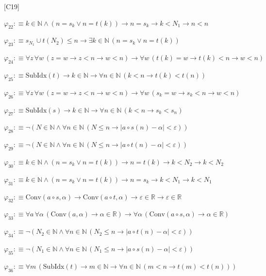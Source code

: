 \begin{fullproof}{[C19]}
\begin{abbrevlist}
\item $\varphi_{22} :\equiv k \in \mathbb{N} \land (n = s_{k} \lor n = t(k)) \to n = s_{k} \to k < N_{1} \to n < n$
\item $\varphi_{23} :\equiv s_{N_{1}} \cup t(N_{2}) \leq n \to \exists k \in \mathbb{N}\,(n = s_{k} \lor n = t(k))$
\item $\varphi_{24} :\equiv \forall z\,\forall w\,(z = w \to z < n \to w < n) \to \forall w\,(t(k) = w \to t(k) < n \to w < n)$
\item $\varphi_{25} :\equiv \mathrm{SubIdx}(t) \to k \in \mathbb{N} \to \forall n \in \mathbb{N}\,(k < n \to t(k) < t(n))$
\item $\varphi_{26} :\equiv \forall z\,\forall w\,(z = w \to z < n \to w < n) \to \forall w\,(s_{k} = w \to s_{k} < n \to w < n)$
\item $\varphi_{27} :\equiv \mathrm{SubIdx}(s) \to k \in \mathbb{N} \to \forall n \in \mathbb{N}\,(k < n \to s_{k} < s_{n})$
\item $\varphi_{28} :\equiv \neg (N \in \mathbb{N} \land \forall n \in \mathbb{N}\,(N \leq n \to \lvert a \circ s(n) - \alpha \rvert < \varepsilon))$
\item $\varphi_{29} :\equiv \neg (N \in \mathbb{N} \land \forall n \in \mathbb{N}\,(N \leq n \to \lvert a \circ t(n) - \alpha \rvert < \varepsilon))$
\item $\varphi_{30} :\equiv k \in \mathbb{N} \land (n = s_{k} \lor n = t(k)) \to n = t(k) \to k < N_{2} \to k < N_{2}$
\item $\varphi_{31} :\equiv k \in \mathbb{N} \land (n = s_{k} \lor n = t(k)) \to n = s_{k} \to k < N_{1} \to k < N_{1}$
\item $\varphi_{32} :\equiv \mathrm{Conv}(a \circ s,\alpha) \to \mathrm{Conv}(a \circ t,\alpha) \to \varepsilon \in \mathbb{R} \to \varepsilon \in \mathbb{R}$
\item $\varphi_{33} :\equiv \forall a\,\forall \alpha\,(\mathrm{Conv}(a,\alpha) \to \alpha \in \mathbb{R}) \to \forall \alpha\,(\mathrm{Conv}(a \circ s,\alpha) \to \alpha \in \mathbb{R})$
\item $\varphi_{34} :\equiv \neg (N_{2} \in \mathbb{N} \land \forall n \in \mathbb{N}\,(N_{2} \leq n \to \lvert a \circ t(n) - \alpha \rvert < \varepsilon))$
\item $\varphi_{35} :\equiv \neg (N_{1} \in \mathbb{N} \land \forall n \in \mathbb{N}\,(N_{1} \leq n \to \lvert a \circ s(n) - \alpha \rvert < \varepsilon))$
\item $\varphi_{36} :\equiv \forall m\,(\mathrm{SubIdx}(t) \to m \in \mathbb{N} \to \forall n \in \mathbb{N}\,(m < n \to t(m) < t(n)))$

\end{abbrevlist}
\end{fullproof}
